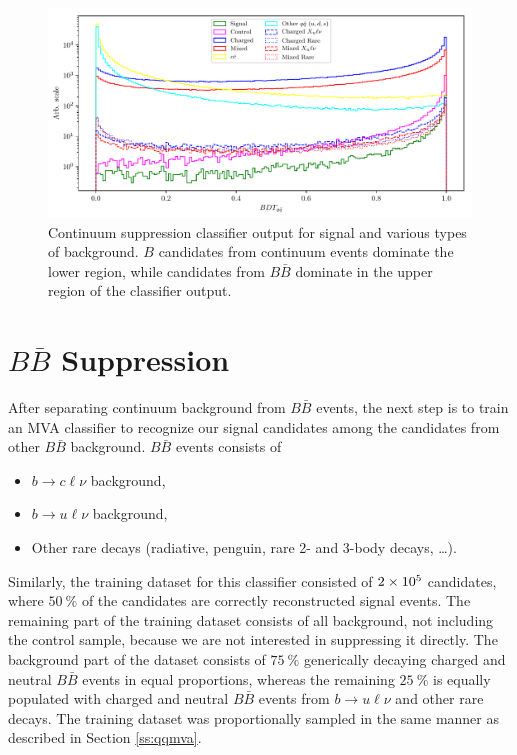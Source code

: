 \begin{figure}[H]
	\centering
	\captionsetup{width=0.8\linewidth}
	\includegraphics[width=\linewidth]{fig/cs_BDT}
	\caption{Continuum suppression classifier output for signal and various types of background. $B$ candidates from continuum events dominate the lower region, while candidates from $B\bar B$ dominate in the upper region of the classifier output.}
	\label{fig:cs_mva}
\end{figure}

\section{\texorpdfstring{$B\bar B$}{BB-bar} Suppression}

After separating continuum background from $B \bar B$ events, the next step is to train an MVA classifier to recognize our signal candidates among the candidates from other $B \bar B$ background. $B \bar B$ events consists of
\begin{itemize}
	\item $b \to c \ell \nu$ background,
	\item $b \to u \ell \nu$ background,
	\item Other rare decays (radiative, penguin, rare 2- and 3-body decays, \dots).
\end{itemize}

Similarly, the training dataset for this classifier consisted of $2\times 10^{5}$ candidates, where $50~\%$ of the candidates are correctly reconstructed signal events. The remaining part of the training dataset consists of all background, not including the control sample, because we are not interested in suppressing it directly. The background part of the dataset consists of $75~\%$  generically decaying charged and neutral $B \bar B$ events in equal proportions, whereas the remaining $25~\%$ is equally populated with charged and neutral $B \bar B$ events from $b \to u \ell \nu$ and other rare decays. The training dataset was proportionally sampled in the same manner as described in Section \ref{ss:qqmva}.


